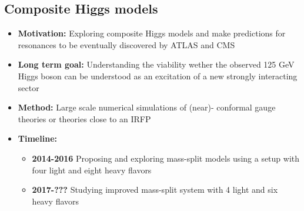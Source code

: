 \documentclass[12pt,hyperpdf]{article}
\begin{document}
\subsection{Composite Higgs models}
\begin{itemize}
    \item{\bf Motivation:} Exploring composite Higgs models and make
     predictions for resonances to be eventually discovered by ATLAS
     and CMS
    \item{\bf Long term goal:} Understanding the viability wether the
     observed 125 GeV Higgs boson can be understood as an excitation of
     a new strongly interacting sector
    \item{\bf Method:} Large scale numerical simulations of (near)-
     conformal gauge theories or theories close to an IRFP
    \item{\bf Timeline:}
\begin{itemize}
    \item{\bf 2014-2016} Proposing and exploring mass-split models using a
     setup with four light and eight heavy flavors
    \item{\bf 2017-???} Studying improved mass-split system with 4 light
     and six heavy flavors
\end{itemize}
\end{itemize}



\newpage


%

%
%

\end{document}
